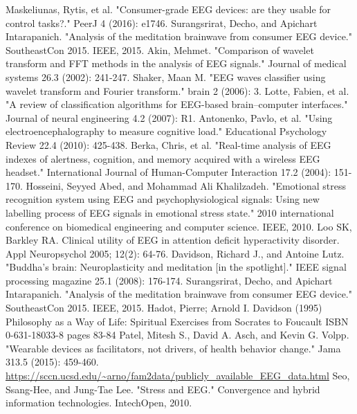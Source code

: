 \documentclass{llncs} %
\begin{document}
\begin{thebibliography}{[MT1]}
    Maskeliunas, Rytis, et al. "Consumer-grade EEG devices: are they usable for control tasks?." PeerJ 4 (2016): e1746.
    Surangsrirat, Decho, and Apichart Intarapanich. "Analysis of the meditation brainwave from consumer EEG device." SoutheastCon 2015. IEEE, 2015.
    Akin, Mehmet. "Comparison of wavelet transform and FFT methods in the analysis of EEG signals." Journal of medical systems 26.3 (2002): 241-247.
    Shaker, Maan M. "EEG waves classifier using wavelet transform and Fourier transform." brain 2 (2006): 3.
    Lotte, Fabien, et al. "A review of classification algorithms for EEG-based brain–computer interfaces." Journal of neural engineering 4.2 (2007): R1.
    Antonenko, Pavlo, et al. "Using electroencephalography to measure cognitive load." Educational Psychology Review 22.4 (2010): 425-438.
    Berka, Chris, et al. "Real-time analysis of EEG indexes of alertness, cognition, and memory acquired with a wireless EEG headset." International Journal of Human-Computer Interaction 17.2 (2004): 151-170.
    Hosseini, Seyyed Abed, and Mohammad Ali Khalilzadeh. "Emotional stress recognition system using EEG and psychophysiological signals: Using new labelling process of EEG signals in emotional stress state." 2010 international conference on biomedical engineering and computer science. IEEE, 2010.
    Loo SK, Barkley RA. Clinical utility of EEG in attention deficit hyperactivity disorder. Appl Neuropsychol 2005; 12(2): 64-76.
    Davidson, Richard J., and Antoine Lutz. "Buddha's brain: Neuroplasticity and meditation [in the spotlight]." IEEE signal processing magazine 25.1 (2008): 176-174.
    Surangsrirat, Decho, and Apichart Intarapanich. "Analysis of the meditation brainwave from consumer EEG device." SoutheastCon 2015. IEEE, 2015.
    Hadot, Pierre; Arnold I. Davidson (1995) Philosophy as a Way of Life: Spiritual Exercises from Socrates to Foucault ISBN 0-631-18033-8 pages 83-84
    Patel, Mitesh S., David A. Asch, and Kevin G. Volpp. "Wearable devices as facilitators, not drivers, of health behavior change." Jama 313.5 (2015): 459-460.
    \url{https://sccn.ucsd.edu/~arno/fam2data/publicly_available_EEG_data.html}
    Seo, Ssang-Hee, and Jung-Tae Lee. "Stress and EEG." Convergence and hybrid information technologies. IntechOpen, 2010.

\end{thebibliography}
\end{document}
